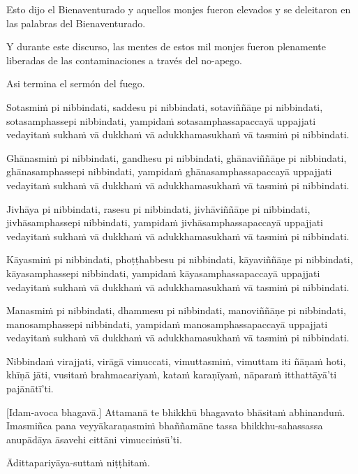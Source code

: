 \enlargethispage{\baselineskip}

Esto dijo el Bienaventurado y aquellos monjes fueron elevados y se deleitaron en las palabras del Bienaventurado.

Y durante este discurso, las mentes de estos mil monjes fueron plenamente liberadas de las contaminaciones a través del no-apego.


Asi termina el sermón del fuego.

\clearpage

\paliText
\markboth{\paliTitle}{\rightmark}

Sotasmiṁ pi nibbindati, saddesu pi nibbindati, sotaviññāṇe pi
nibbindati, sotasamphassepi nibbindati, yampidaṁ sotasamphassapaccayā
uppajjati vedayitaṁ sukhaṁ vā dukkhaṁ vā adukkhamasukhaṁ vā tasmiṁ pi
nibbindati.

Ghānasmiṁ pi nibbindati, gandhesu pi nibbindati, ghānaviññāṇe pi
nibbindati, ghānasamphassepi nibbindati, yampidaṁ ghānasamphassapaccayā
uppajjati vedayitaṁ sukhaṁ vā dukkhaṁ vā adukkhamasukhaṁ vā tasmiṁ pi
nibbindati.

Jivhāya pi nibbindati, rasesu pi nibbindati, jivhāviññāṇe pi nibbindati,
jivhāsamphassepi nibbindati, yampidaṁ jivhāsamphassapaccayā uppajjati
vedayitaṁ sukhaṁ vā dukkhaṁ vā adukkhamasukhaṁ vā tasmiṁ pi nibbindati.

Kāyasmiṁ pi nibbindati, phoṭṭhabbesu pi nibbindati, kāyaviññāṇe pi
nibbindati, kāyasamphassepi nibbindati, yampidaṁ kāyasamphassapaccayā
uppajjati vedayitaṁ sukhaṁ vā dukkhaṁ vā adukkhamasukhaṁ vā tasmiṁ pi
nibbindati.

Manasmiṁ pi nibbindati, dhammesu pi nibbindati, manoviññāṇe pi
nibbindati, manosamphassepi nibbindati, yampidaṁ manosamphassapaccayā
uppajjati vedayitaṁ sukhaṁ vā dukkhaṁ vā adukkhamasukhaṁ vā tasmiṁ pi
nibbindati.

Nibbindaṁ virajjati, virāgā vimuccati, vimuttasmiṁ, vimuttam iti ñāṇaṁ
hoti, khīṇā jāti, vusitaṁ brahmacariyaṁ, kataṁ karaṇīyaṁ, nāparaṁ
itthattāyā'ti pajānātī'ti.

\enlargethispage{\baselineskip}

[Idam-avoca bhagavā.] Attamanā te bhikkhū bhagavato bhāsitaṁ abhinanduṁ.
Imasmiñca pana veyyākaraṇasmiṁ bhaññamāne tassa bhikkhu-sahassassa
anupādāya āsavehi cittāni vimucciṁsū'ti.

Ādittapariyāya-suttaṁ niṭṭhitaṁ.

\resumeNormalText

